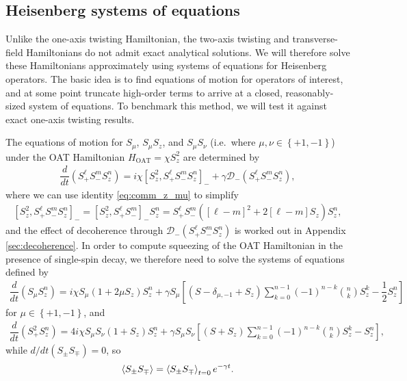 \documentclass[aps,notitlepage,nofootinbib,11pt]{revtex4-1}
\renewcommand{\t}{\text} %
\newcommand{\f}[2]{\dfrac{#1}{#2}} %
\newcommand{\p}[1]{\left(#1\right)} %
\renewcommand{\sp}[1]{\left[#1\right]} %
\renewcommand{\set}[1]{\left\{#1\right\}} %
\newcommand{\bk}{\Braket} %
\newcommand{\D}{\mathcal{D}}
\newcommand{\1}{\mathds{1}}
\begin{document}
\subsection{Heisenberg systems of equations}

Unlike the one-axis twisting Hamiltonian, the two-axis twisting and
transverse-field Hamiltonians do not admit exact analytical
solutions. We will therefore solve these Hamiltonians approximately
using systems of equations for Heisenberg operators.  The basic idea
is to find equations of motion for operators of interest, and at some
point truncate high-order terms to arrive at a closed,
reasonably-sized system of equations.  To benchmark this method, we
will test it against exact one-axis twisting results.

The equations of motion for $S_\mu$, $S_\mu S_z$, and $S_\mu S_\nu$
(i.e.~where $\mu,\nu\in\set{+1,-1}$) under the OAT Hamiltonian
$H_{\t{OAT}}=\chi S_z^2$ are determined by
\begin{align}
  \f{d}{dt} \p{S_+^\ell S_-^m S_z^n}
  = i\chi \sp{S_z^2, S_+^\ell S_-^m S_z^n}_-
  + \gamma \D_-\p{S_+^\ell S_-^m S_z^n},
\end{align}
where we can use identity \eqref{eq:comm_z_mu} to simplify
\begin{align}
  \sp{S_z^2, S_+^\ell S_-^m S_z^n}_-
  = \sp{S_z^2, S_+^\ell S_-^m}_- S_z^n
  = S_+^\ell S_-^m \p{\sp{\ell-m}^2 + 2\sp{\ell-m} S_z} S_z^n,
  \label{eq:S_z^2_comm}
\end{align}
and the effect of decoherence through $\D_-\p{S_+^\ell S_-^m S_z^n}$ is
worked out in Appendix \ref{sec:decoherence}.  In order to compute
squeezing of the OAT Hamiltonian in the presence of single-spin decay,
we therefore need to solve the systems of equations defined by
\begin{align}
  \f{d}{dt} \p{S_\mu S_z^n}
  = i\chi S_\mu \p{1 + 2\mu S_z} S_z^n
  + \gamma S_\mu \sp{\p{S - \delta_{\mu,-1} + S_z} \sum_{k=0}^{n-1}
    \p{-1}^{n-k} { n \choose k } S_z^k - \f12 S_z^n}
\end{align}
for $\mu\in\set{+1,-1}$, and
\begin{align}
  \f{d}{dt} \p{S_+^2 S_z^n}
  = 4i\chi S_\mu S_\nu \p{1 + S_z} S_z^n
  + \gamma S_\mu S_\nu \sp{\p{S + S_z} \sum_{k=0}^{n-1}
    \p{-1}^{n-k} { n \choose k } S_z^k - S_z^n},
\end{align}
while $d/dt\p{S_\pm S_\mp}=0$, so
\begin{align}
  \bk{S_\pm S_\mp} = \bk{S_\pm S_\mp}_{t=0} e^{-\gamma t}.
\end{align}
\end{document}
